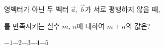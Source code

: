 영벡터가 아닌 두 벡터 $\vec{a}$, $\vec{b}$가 서로 평행하지 않을 때, \par\smallskip{}\par\smallskip\noindent 를 만족시키는 실수 $m$, $n$에 대하여 $m+n$의 값은?
\begin{choices32}{$-1$}{$-2$}{$-3$}{$-4$}{$-5$}\end{choices32}

